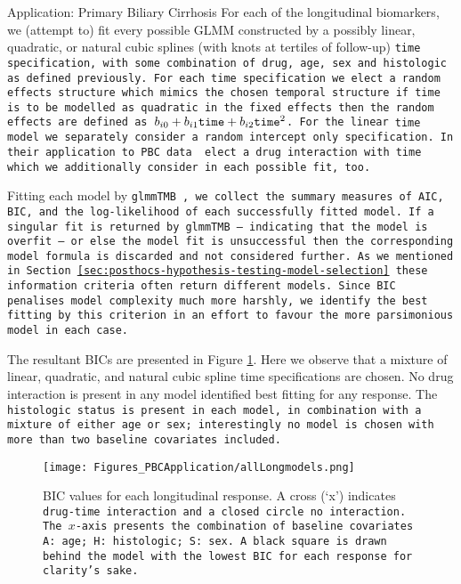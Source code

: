 \begin{chapter}{\label{cha:app-PBC}Application: Primary Biliary Cirrhosis}
  For each of the longitudinal biomarkers, we (attempt to) fit every possible GLMM constructed by a possibly linear, quadratic, or natural cubic splines (with knots at tertiles of follow-up) \tt{time} specification, with some combination of \tt{drug}, \tt{age}, \tt{sex} and \tt{histologic} as defined previously. For each \tt{time} specification we elect a random effects structure which mimics the chosen temporal structure \ie if \tt{time} is to be modelled as quadratic in the fixed effects then the random effects are defined as $b_{i0} + b_{i1}\tt{time} + b_{i2}\tt{time}^2$. For the linear \tt{time} model we separately consider a random intercept only specification. In their application to PBC data \citet{Rustand2023} elect a \tt{drug} interaction with \tt{time} which we additionally consider in each possible fit, too.

  Fitting each model by \tt{glmmTMB} \citep{R-glmmTMB}, we collect the summary measures of AIC, BIC, and the log-likelihood of each successfully fitted model. If a singular fit is returned by \tt{glmmTMB} -- indicating that the model is overfit -- or else the model fit is unsuccessful then the corresponding model formula is discarded and not considered further. As we mentioned in Section \ref{sec:posthocs-hypothesis-testing-model-selection} these information criteria often return different models. Since BIC penalises model complexity much more harshly, we identify the best fitting by this criterion in an effort to favour the more parsimonious model in each case.

  The resultant BICs are presented in Figure \ref{fig:pbc-longitudinal-allmodels}. Here we observe that a mixture of linear, quadratic, and natural cubic spline time specifications are chosen. No drug interaction is present in any model identified best fitting for any response. The \tt{histologic} status is present in each model, in combination with a mixture of either \tt{age} or \tt{sex}; interestingly no model is chosen with more than two baseline covariates included.

  \begin{figure}[ht]
      \centering
      \texttt{[image: Figures\_PBCApplication/allLongmodels.png]}
      \caption{BIC values for each longitudinal response. A cross (`x') indicates \tt{drug}-\tt{time} interaction and a closed circle no interaction. The $x$-axis presents the combination of baseline covariates \tt{A}: \tt{age}; \tt{H}: \tt{histologic}; \tt{S}: \tt{sex}. A black square is drawn behind the model with the lowest BIC for each response for clarity's sake.}
      \label{fig:pbc-longitudinal-allmodels}
  \end{figure}
  

\end{chapter}

